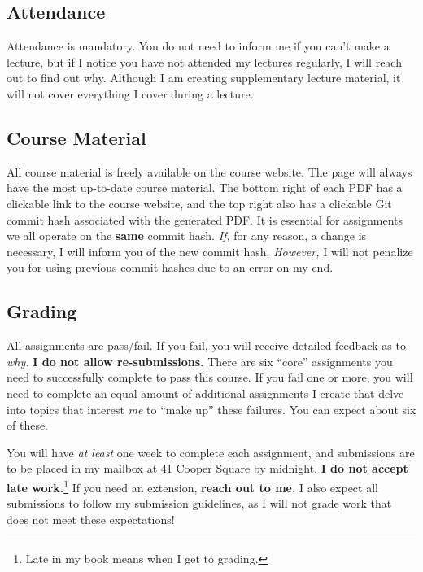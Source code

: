 \documentclass{article}
\begin{document}
\subsection{Attendance}

Attendance is mandatory.  You do not need to inform me if you can't make
a lecture, but if I notice you have not attended my lectures regularly,
I will reach out to find out why.  Although I am creating supplementary
lecture material, it will not cover everything I cover during a lecture.

\subsection{Course Material}

All course material is freely available on the course website.  The page
will always have the most up-to-date course material.  The bottom right
of each PDF has a clickable link to the course website, and the top
right also has a clickable Git commit hash associated with the generated
PDF.  It is essential for assignments we all operate on the \textbf{%
same} commit hash.  \emph{If,} for any reason, a change is necessary, I
will inform you of the new commit hash.  \emph{However,} I will not
penalize you for using previous commit hashes due to an error on my end.

\subsection{Grading}

All assignments are pass/fail.  If you fail, you will receive detailed
feedback as to \emph{why.}  \textbf{I do not allow re-submissions.}
There are six \enquote{core} assignments you need to successfully
complete to pass this course.  If you fail one or more, you will need to
complete an equal amount of additional assignments I create that delve
into topics that interest \emph{me} to \enquote{make up} these failures.
You can expect about six of these.

You will have \emph{at least} one week to complete each assignment, and
submissions are to be placed in my mailbox at 41 Cooper Square by
midnight.  \textbf{I do not accept late work.}\footnote{Late in my book
means when I get to grading.}  If you need an extension, \textbf{reach
out to me.}  I also expect all submissions to follow my submission
guidelines, as I \underline{will not grade} work that does
not meet these expectations!
\end{document}
